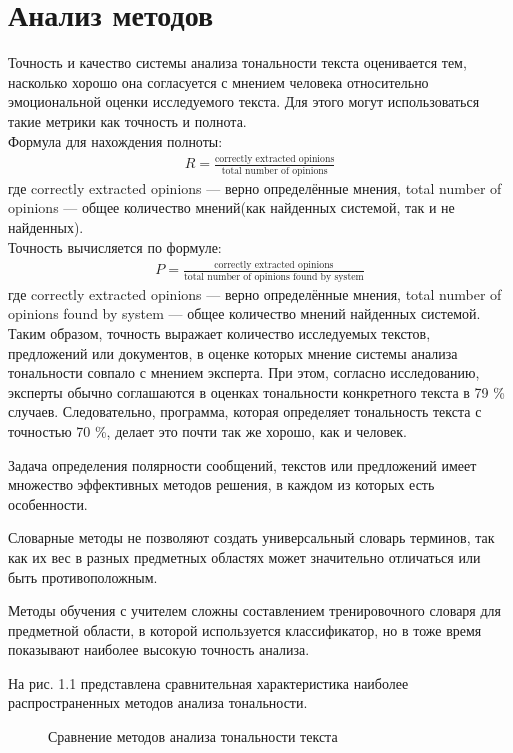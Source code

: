 \documentclass[a4paper,12pt]{report}
\begin{document}
\section{Анализ методов}
\hspace{0.6cm}Точность и качество системы анализа тональности текста оценивается тем, насколько хорошо она согласуется с мнением человека относительно эмоциональной оценки исследуемого текста. Для этого могут использоваться такие метрики как точность и полнота. \\
Формула для нахождения полноты:
\begin{align}
R = \frac {\text{correctly extracted opinions}}{\text{total number of opinions}}
\end{align}
где correctly extracted opinions — верно определённые мнения, total number of opinions — общее количество мнений(как найденных системой, так и не найденных).\\
 Точность вычисляется по формуле:
\begin{align}
P=\frac {\text{correctly extracted opinions}}{\text{total number of opinions found by system}}
\end{align}
где correctly extracted opinions — верно определённые мнения, total number of opinions found by system — общее количество мнений найденных системой.\\
\hspace{0.6cm}Таким образом, точность выражает количество исследуемых текстов, предложений или документов, в оценке которых мнение системы анализа тональности совпало с мнением эксперта. При этом, согласно исследованию, эксперты обычно соглашаются в оценках тональности конкретного текста в 79 \% случаев. Следовательно, программа, которая определяет тональность текста с точностью 70 \%, делает это почти так же хорошо, как и человек.

Задача определения полярности сообщений, текстов или предложений имеет множество эффективных методов решения, в каждом из которых есть особенности.

Словарные методы не позволяют создать универсальный словарь терминов, так как их вес в разных предметных областях может значительно отличаться или быть противоположным.

Методы обучения с учителем сложны составлением тренировочного словаря для предметной области, в которой используется классификатор, но в тоже время показывают наиболее высокую точность анализа.

На рис. 1.1 представлена сравнительная характеристика наиболее распространенных
методов анализа тональности.
\begin{figure}[ht!]
\caption{Сравнение методов анализа тональности текста}
\end{figure}
\newpage
\end{document}
